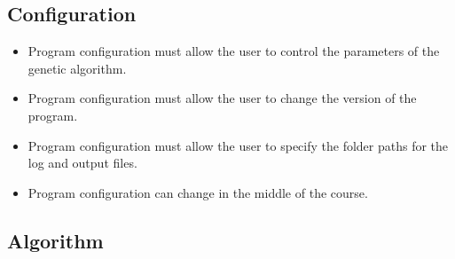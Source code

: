 \subsection{Configuration}

\begin{itemize}
    \item Program configuration must allow the user to control the parameters of the genetic algorithm.
    \item Program configuration must allow the user to change the version of the program.
    \item Program configuration must allow the user to specify the folder paths for the log and output files.
    \item Program configuration can change in the middle of the course.
\end{itemize}

\subsection{Algorithm}

